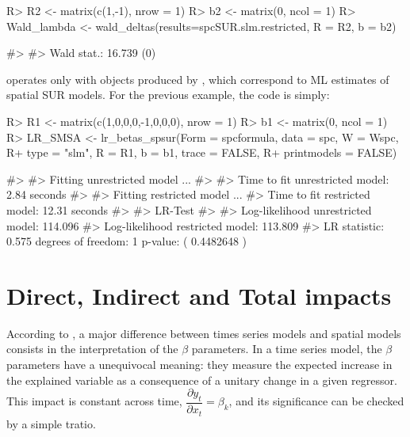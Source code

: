 \documentclass[article]{jss}
\begin{document}
\begin{CodeChunk}

\begin{CodeInput}
R> R2 <- matrix(c(1,-1), nrow = 1)
R> b2 <- matrix(0, ncol = 1)
R> Wald_lambda <- wald_deltas(results=spcSUR.slm.restricted, R = R2, b = b2)
\end{CodeInput}

\begin{CodeOutput}
#> 
#>  Wald stat.: 16.739 (0)
\end{CodeOutput}
\end{CodeChunk}

 operates only with objects produced by , which correspond to ML estimates of spatial SUR models. For the previous example, the code is simply:

\begin{CodeChunk}

\begin{CodeInput}
R> R1 <- matrix(c(1,0,0,0,-1,0,0,0), nrow = 1)
R> b1 <- matrix(0, ncol = 1)
R> LR_SMSA <- lr_betas_spsur(Form = spcformula, data = spc, W = Wspc,
R+                            type = "slm", R = R1, b = b1, trace = FALSE,
R+                            printmodels = FALSE)
\end{CodeInput}

\begin{CodeOutput}
#> 
#>  Fitting unrestricted model ... 
#> 
#>  Time to fit unrestricted model:  2.84  seconds
#> 
#>  Fitting restricted model ... 
#> Time to fit restricted model:  12.31  seconds
#> 
#>  LR-Test 
#> 
#>  Log-likelihood unrestricted model:  114.096
#>  Log-likelihood restricted model:  113.809
#>  LR statistic:  0.575  degrees of freedom:  1  p-value: ( 0.4482648 )
\end{CodeOutput}
\end{CodeChunk}

\hypertarget{impacts}{%
\section{Direct, Indirect and Total impacts}\label{impacts}}

According to \citet{LeSage2009}, a major difference between times series models and spatial models consists in the interpretation of the \(\beta\) parameters. In a time series model, the \(\beta\) parameters have a unequivocal meaning: they measure the expected increase in the explained variable as a consequence of a unitary change in a given regressor. This impact is constant across time, \(\dfrac{\partial y_{t}}{\partial x_{t}} = \beta_{k}\), and its significance can be checked by a simple tratio.
\end{document}
